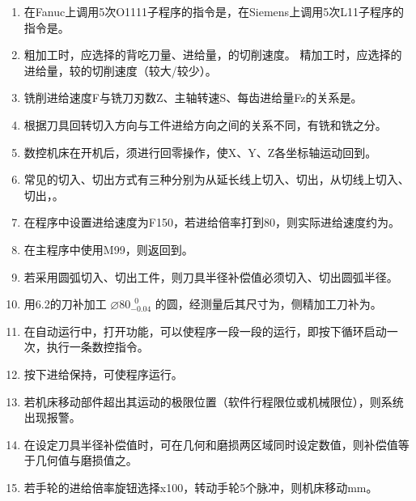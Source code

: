 \documentclass[12pt,twocolumn,landscape,UTF8,twoside,fontset=windows]{ctexart}%
\begin{document}
\begin{enumerate} [1.]
	\item 在Fanuc上调用5次O1111子程序的指令是，在Siemens上调用5次L11子程序的指令是。

	\item 粗加工时，应选择的背吃刀量、进给量，的切削速度。
	      精加工时，应选择的进给量，较的切削速度（较大/较少）。

	\item 铣削进给速度F与铣刀刃数Z、主轴转速S、每齿进给量Fz的关系是。

	\item 根据刀具回转切入方向与工件进给方向之间的关系不同，有铣和铣之分。

	\item 数控机床在开机后，须进行回零操作，使X、Y、Z各坐标轴运动回到。

	\item 常见的切入、切出方式有三种分别为从延长线上切入、切出，从切线上切入、切出，。

	\item 在程序中设置进给速度为F150，若进给倍率打到80，则实际进给速度约为。

	\item 在主程序中使用M99，则返回到。

	\item 若采用圆弧切入、切出工件，则刀具半径补偿值必须切入、切出圆弧半径。

	\item 用6.2的刀补加工 $\diameter 80^{~\;0}_{-0.04}$ 的圆，经测量后其尺寸为，侧精加工刀补为。

	\item 在自动运行中，打开功能，可以使程序一段一段的运行，即按下循环启动一次，执行一条数控指令。

	\item 按下进给保持，可使程序运行。

	\item 若机床移动部件超出其运动的极限位置（软件行程限位或机械限位），则系统出现报警。

	\item 在设定刀具半径补偿值时，可在几何和磨损两区域同时设定数值，则补偿值等于几何值与磨损值之。

	\item 若手轮的进给倍率旋钮选择x100，转动手轮5个脉冲，则机床移动mm。
\end{enumerate}
\end{document}
